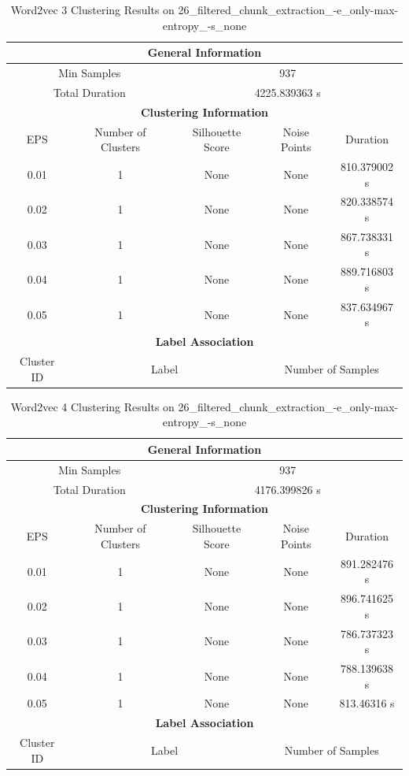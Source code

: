 \begin{longtable}{|c|c|c|c|c|}
\caption{Word2vec 3 Clustering Results on 26\_filtered\_chunk\_extraction\_-e\_only-max-entropy\_-s\_none} \label{tab:26_filtered_chunk_extraction_-e_only-max-entropy_-s_none_word2vec_3_clustering_results}\\
\hline
\multicolumn{5}{|c|}{\textbf{General Information}} \\
\hline
\multicolumn{2}{|c|}{Min Samples} & \multicolumn{3}{c|}{937} \\
\multicolumn{2}{|c|}{Total Duration} & \multicolumn{3}{c|}{4225.839363 s} \\
\hline
\multicolumn{5}{|c|}{\textbf{Clustering Information}} \\
\hline
EPS & Number of Clusters & Silhouette Score & Noise Points & Duration \\
0.01 & 1 & None & None & 810.379002 s\\
0.02 & 1 & None & None & 820.338574 s\\
0.03 & 1 & None & None & 867.738331 s\\
0.04 & 1 & None & None & 889.716803 s\\
0.05 & 1 & None & None & 837.634967 s\\
\hline
\multicolumn{5}{|c|}{\textbf{Label Association}} \\
\hline
Cluster ID & \multicolumn{2}{c|}{Label} & \multicolumn{2}{c|}{Number of Samples} \\
\hline
\end{longtable}


\begin{longtable}{|c|c|c|c|c|}
\caption{Word2vec 4 Clustering Results on 26\_filtered\_chunk\_extraction\_-e\_only-max-entropy\_-s\_none} \label{tab:26_filtered_chunk_extraction_-e_only-max-entropy_-s_none_word2vec_4_clustering_results}\\
\hline
\multicolumn{5}{|c|}{\textbf{General Information}} \\
\hline
\multicolumn{2}{|c|}{Min Samples} & \multicolumn{3}{c|}{937} \\
\multicolumn{2}{|c|}{Total Duration} & \multicolumn{3}{c|}{4176.399826 s} \\
\hline
\multicolumn{5}{|c|}{\textbf{Clustering Information}} \\
\hline
EPS & Number of Clusters & Silhouette Score & Noise Points & Duration \\
0.01 & 1 & None & None & 891.282476 s\\
0.02 & 1 & None & None & 896.741625 s\\
0.03 & 1 & None & None & 786.737323 s\\
0.04 & 1 & None & None & 788.139638 s\\
0.05 & 1 & None & None & 813.46316 s\\
\hline
\multicolumn{5}{|c|}{\textbf{Label Association}} \\
\hline
Cluster ID & \multicolumn{2}{c|}{Label} & \multicolumn{2}{c|}{Number of Samples} \\
\hline
\end{longtable}


